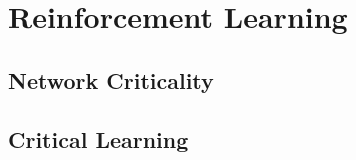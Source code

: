 \section{Reinforcement Learning}



\subsection{Network Criticality}



\subsection{Critical Learning}


